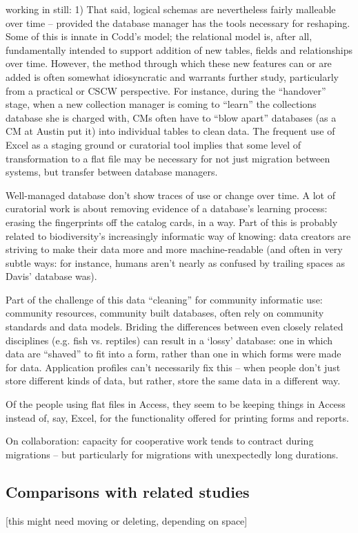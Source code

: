 working in still:
1)	That said, logical schemas are nevertheless fairly malleable over time – provided the database manager has the tools necessary for reshaping. Some of this is innate in Codd’s model; the relational model is, after all, fundamentally intended to support addition of new tables, fields and relationships over time. However, the method through which these new features can or are added is often somewhat idiosyncratic and warrants further study, particularly from a practical or CSCW perspective. For instance, during the “handover” stage, when a new collection manager is coming to “learn” the collections database she is charged with, CMs often have to “blow apart” databases (as a CM at Austin put it) into individual tables to clean data. The frequent use of Excel as a staging ground or curatorial tool implies that some level of transformation to a flat file may be necessary for not just migration between systems, but transfer between database managers. 


Well-managed database don’t show traces of use or change over time.  A lot of curatorial work is about removing evidence of a database’s learning process: erasing the fingerprints off the catalog cards, in a way.  Part of this is probably related to biodiversity’s increasingly informatic way of knowing: data creators are striving to make their data more and more machine-readable (and often in very subtle ways: for instance, humans aren’t nearly as confused by trailing spaces as Davis’ database was). 

Part of the challenge of this data “cleaning” for community informatic use: community resources, community built databases, often rely on community standards and data models.  Briding the differences between even closely related disciplines (e.g. fish vs. reptiles) can result in a ‘lossy’ database: one in which data are “shaved” to fit into a form, rather than one in which forms were made for data.  
Application profiles can’t necessarily fix this – when people don’t just store different kinds of data, but rather, store the same data in a different way.

Of the people using flat files in Access, they seem to be keeping things in Access instead of, say, Excel, for the functionality offered for printing forms and reports. 


On collaboration: capacity for cooperative work tends to contract during migrations – but particularly for migrations with unexpectedly long durations.


\subsection{Comparisons with related studies}
[this might need moving or deleting, depending on space]

